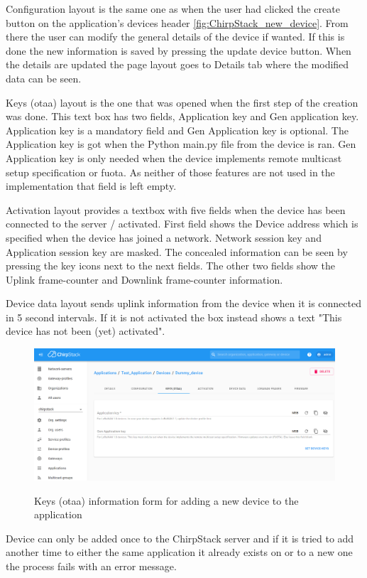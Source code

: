 Configuration layout is the same one as when the user had clicked the create button on the application's devices header \ref{fig:ChirpStack_new_device}.
From there the user can modify the general details of the device if wanted.
If this is done the new information is saved by pressing the update device button.
When the details are updated the page layout goes to Details tab where the modified data can be seen.

Keys (\gls{otaa}) layout is the one that was opened when the first step of the creation was done.
This text box has two fields, Application key and Gen application key.
Application key is a mandatory field and Gen Application key is optional.
The Application key is got when the Python main.py file from the device is ran.
Gen Application key is only needed when the device implements remote multicast setup specification or \gls{fuota}.
As neither of those features are not used in the implementation that field is left empty.

Activation layout provides a textbox with five fields when the device has been connected to the server / activated.
First field shows the Device address which is specified when the device has joined a network.
Network session key and Application session key are masked.
The concealed information can be seen by pressing the key icons next to the next fields.
The other two fields show the Uplink frame-counter and Downlink frame-counter information.

Device data layout sends uplink information from the device when it is connected in 5 second intervals.
If it is not activated the box instead shows a text "This device has not been (yet) activated".


\begin{figure}[ht]
  \centering
  {\includegraphics[width=\textwidth]{illustration/ChirpStack_new_device_2.png}}
  \caption{Keys (\gls{otaa}) information form for adding a new device to the application}
  \label{fig:ChirpStack_new_device_2}
\end{figure}

Device can only be added once to the ChirpStack server and if it is tried to add another time to either the same application it already exists on or to a new one the process fails with an error message.


\clearpage %
